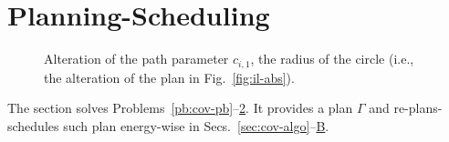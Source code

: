 \documentclass[letterpaper,10pt,journal,twoside]{IEEEtran}
\newcommand{\figpath}{./figures}
\theoremstyle{definition}
\begin{document}




\section{Planning-Scheduling}  %
\label{sec:algo}               %
\begin{figure}[t]
  \footnotesize
  \begin{minipage}[l]{0.25\columnwidth}
    \caption{Alteration of the path parameter $c_{i,1}$, the radius of the circle (i.e., the alteration of the plan in Fig.~\ref{fig:il-abs}).
    }
    \label{fig:tee1}
  \end{minipage}\hfill
  \begin{minipage}[c]{0.7\columnwidth}
    \centering
    \vspace*{-4.5ex}
    
  \end{minipage}
  \vspace*{-4.5ex}
\end{figure}

The section solves Problems~\ref{pb:cov-pb}--\hyperref[pb]{2}. It provides a plan $\Gamma$ and re-plans-schedules such plan energy-wise %
in Secs.~\ref{sec:cov-algo}--\hyperref[sec:repla-algo]{B}.

\vspace*{-1.4ex}
\end{document}
